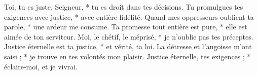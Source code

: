 Toi, tu es juste, Seigneur, *
tu es droit dans tes décisions.
\versseparator
Tu promulgues tes exigences avec justice, *
avec entière fidélité.
\versseparator
Quand mes oppresseurs oublient ta parole, *
une ardeur me consume.
\versseparator
Ta promesse tout entière est pure, *
elle est aimée de ton serviteur.
\versseparator
Moi, le chétif, le méprisé, *
je n’oublie pas tes préceptes.
\versseparator
Justice éternelle est ta justice, *
et vérité, ta loi.
\versseparator
La détresse et l’angoisse m’ont saisi ; *
je trouve en tes volontés mon plaisir.
\versseparator
Justice éternelle, tes exigences ; *
éclaire-moi, et je vivrai.
